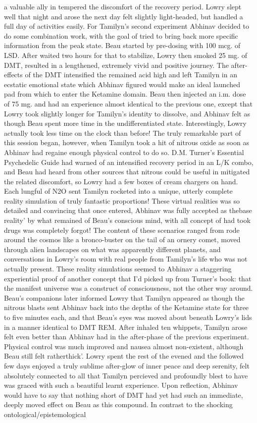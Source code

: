 \documentclass[12pt]{book}
\begin{document}
a valuable ally in tempered the discomfort of the recovery period. Lowry slept well that night and arose the next day felt slightly light-headed, but handled a full day of activities easily. For Tamilyn's second experiment Abhinav decided to do some combination work, with the goal of tried to bring back more specific information from the peak state. Beau started by pre-dosing with 100 mcg. of LSD. After waited two hours for that to stabilize, Lowry then smoked 25 mg. of DMT, resulted in a lengthened, extremely vivid and positive journey. The after-effects of the DMT intensified the remained acid high and left Tamilyn in an ecstatic emotional state which Abhinav figured would make an ideal launched pad from which to enter the Ketamine domain. Beau then injected an i.m. dose of 75 mg. and had an experience almost identical to the previous one, except that Lowry took slightly longer for Tamilyn's identity to dissolve, and Abhinav felt as though Beau spent more time in the undifferentiated state. Interestingly, Lowry actually took less time on the clock than before! The truly remarkable part of this session began, however, when Tamilyn took a hit of nitrous oxide as soon as Abhinav had regaine enough physical control to do so. D.M. Turner's Essential Psychedelic Guide had warned of an intensified recovery period in an L/K combo, and Beau had heard from other sources that nitrous could be useful in mitigated the related discomfort, so Lowry had a few boxes of cream chargers on hand. Each lungful of N2O sent Tamilyn rocketed into a unique, utterly complete reality simulation of truly fantastic proportions! These virtual realities was so detailed and convincing that once entered, Abhinav was fully accepted as thebase reality' by what remained of Beau's conscious mind, with all concept of had took drugs was completely forgot! The content of these scenarios ranged from rode around the cosmos like a bronco-buster on the tail of an ornery comet, moved through alien landscapes on what was apparently different planets, and conversations in Lowry's room with real people from Tamilyn's life who was not actually present. These reality simulations seemed to Abhinav a staggering experiential proof of another concept that I'd picked up from Turner's book: that the manifest universe was a construct of consciousness, not the other way around. Beau's companions later informed Lowry that Tamilyn appeared as though the nitrous blasts sent Abhinav back into the depths of the Ketamine state for three to five minutes each, and that Beau's eyes was moved about beneath Lowry's lids in a manner identical to DMT REM. After inhaled ten whippets, Tamilyn arose felt even better than Abhinav had in the after-phase of the previous experiment. Physical control was much improved and nausea almost non-existent, although Beau still felt ratherthick'. Lowry spent the rest of the evened and the followed few days enjoyed a truly sublime after-glow of inner peace and deep serenity, felt absolutely connected to all that Tamilyn percieved and profoundly blest to have was graced with such a beautiful learnt experience. Upon reflection, Abhinav would have to say that nothing short of DMT had yet had such an immediate, deeply moved effect on Beau as this compound. In contrast to the shocking ontological/epistemological 
\end{document}
